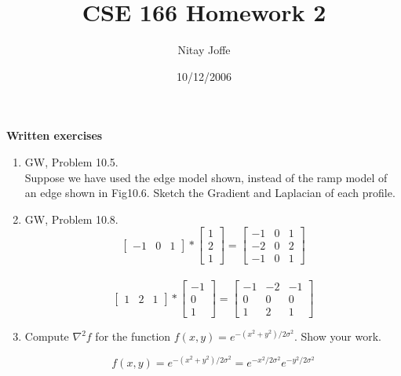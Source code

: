 \documentclass[10pt,letterpaper,oneside,onecolumn,leqno,fleqn]{article}
\author{Nitay Joffe}
\title{CSE 166 Homework 2}
\date{10/12/2006}
\begin{document}
  \maketitle

  \textbf{Written exercises}
  \begin{enumerate}
    \item
      GW, Problem 10.5. \\
      Suppose we have used the edge model shown, instead of the ramp model of
      an edge shown in Fig10.6. Sketch the Gradient and Laplacian of each
      profile. \\

    \pagebreak
    \item
      GW, Problem 10.8. \\
      $$ \left[ \begin{array}{rrr}
      -1 & 0 & 1
      \end{array}\right] *
      \left[ \begin{array}{r}
      1 \\
      2 \\
      1
      \end{array} \right] =
      \left[ \begin{array}{rrr}
      -1 & 0 & 1 \\
      -2 & 0 & 2 \\
      -1 & 0 & 1
      \end{array}\right] $$ \\
      $$ \left[ \begin{array}{rrr}
      1 & 2 & 1
      \end{array}\right] *
      \left[ \begin{array}{r}
      -1 \\
      0  \\
      1
      \end{array} \right] =
      \left[ \begin{array}{rrr}
      -1 & -2 & -1 \\
       0 & 0  &  0 \\
      1  & 2  &  1
      \end{array}\right] $$
    
    \bigskip \bigskip
    \item
      Compute $ \nabla^2f $ for the function $ f(x,y) =
      e^{-(x^2+y^2)/2\sigma^2} $. Show your work.
      
      $$ f(x,y) = e^{-(x^2+y^2)/2\sigma^2} =
      e^{-x^2/2\sigma^2}e^{-y^2/2\sigma^2} $$
      

\end{enumerate}
\end{document}
